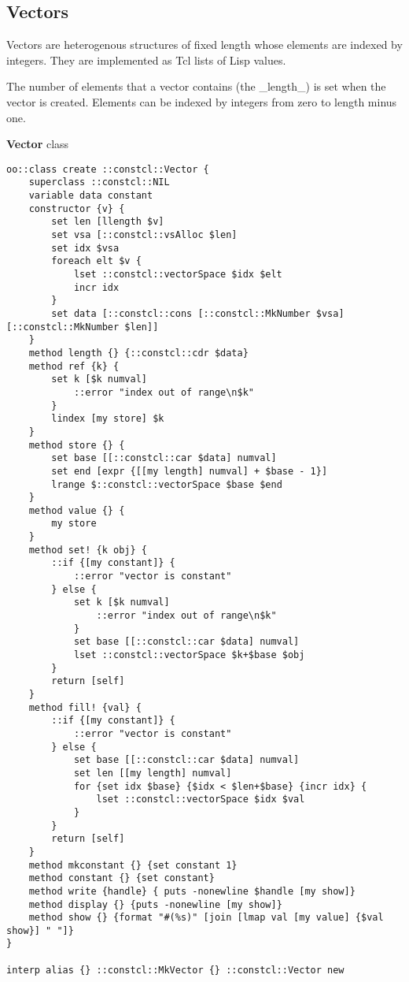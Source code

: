 \documentclass{report}
\begin{document}
\subsection{Vectors}
\label{vectors}

Vectors are heterogenous structures of fixed length whose elements are indexed by integers. They are implemented as Tcl lists of Lisp values.


The number of elements that a vector contains (the \_length\_) is set when the vector is created. Elements can be indexed by integers from zero to length minus one.


\textbf{Vector} class

\noindent\makebox[\linewidth]{\rule{\linewidth}{0.4pt}}
\begin{lstlisting}
oo::class create ::constcl::Vector {
    superclass ::constcl::NIL
    variable data constant
    constructor {v} {
        set len [llength $v]
        set vsa [::constcl::vsAlloc $len]
        set idx $vsa
        foreach elt $v {
            lset ::constcl::vectorSpace $idx $elt
            incr idx
        }
        set data [::constcl::cons [::constcl::MkNumber $vsa] [::constcl::MkNumber $len]]
    }
    method length {} {::constcl::cdr $data}
    method ref {k} {
        set k [$k numval]
            ::error "index out of range\n$k"
        }
        lindex [my store] $k
    }
    method store {} {
        set base [[::constcl::car $data] numval]
        set end [expr {[[my length] numval] + $base - 1}]
        lrange $::constcl::vectorSpace $base $end
    }
    method value {} {
        my store
    }
    method set! {k obj} {
        ::if {[my constant]} {
            ::error "vector is constant"
        } else {
            set k [$k numval]
                ::error "index out of range\n$k"
            }
            set base [[::constcl::car $data] numval]
            lset ::constcl::vectorSpace $k+$base $obj
        }
        return [self]
    }
    method fill! {val} {
        ::if {[my constant]} {
            ::error "vector is constant"
        } else {
            set base [[::constcl::car $data] numval]
            set len [[my length] numval]
            for {set idx $base} {$idx < $len+$base} {incr idx} {
                lset ::constcl::vectorSpace $idx $val
            }
        }
        return [self]
    }
    method mkconstant {} {set constant 1}
    method constant {} {set constant}
    method write {handle} { puts -nonewline $handle [my show]}
    method display {} {puts -nonewline [my show]}
    method show {} {format "#(%s)" [join [lmap val [my value] {$val show}] " "]}
}
 
interp alias {} ::constcl::MkVector {} ::constcl::Vector new
\end{lstlisting}
\noindent\makebox[\linewidth]{\rule{\linewidth}{0.4pt}}
\end{document}
